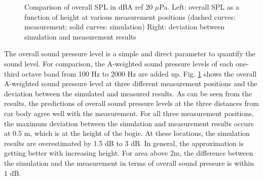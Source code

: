 \begin{figure}[H]
\begin{subfigure}[b]{0.49\textwidth}
	\end{subfigure}
	\caption{Comparison of overall SPL in dBA ref 20 $\mu$Pa. Left: overall SPL as a function of height at various measurement positions (dashed curves: measurement; solid curves: simulation) Right: deviation between simulation and measurement results}
	\label{fig:overall_SPL}
\end{figure}

The overall sound pressure level is a simple and direct parameter to quantify the sound level. For comparison, the A-weighted sound pressure levels of each one-third octave band from 100 Hz to 2000 Hz are added up. Fig. \ref{fig:overall_SPL} shows the overall A-weighted sound pressure level at three different measurement positions and the deviation between the simulated and measured results. As can be seen from the results, the predictions of overall sound pressure levels at the three distances from car body agree well with the measurement. For all three measurement positions, the maximum deviation between the simulation and measurement results occurs at 0.5 m, which is at the height of the bogie. At these locations, the simulation results are overestimated by 1.5 dB to 3 dB. In general, the approximation is getting better with increasing height. For area above 2m, the difference between the simulation and the measurement in terms of overall sound pressure is within 1 dB.

